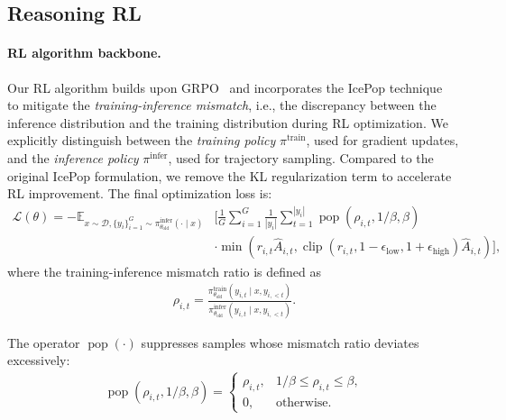 \subsection{Reasoning RL}

\paragraph{RL algorithm backbone.}
Our RL algorithm builds upon GRPO~\cite{shao2024deepseekmath} and incorporates the IcePop technique~\cite{IcePop2025} to mitigate the \emph{training-inference mismatch}, i.e., the discrepancy between the inference distribution and the training distribution during RL optimization. We explicitly distinguish between the \emph{training policy} $\pi^{\text{train}}$, used for gradient updates, and the \emph{inference policy} $\pi^{\text{infer}}$, used for trajectory sampling. Compared to the original IcePop formulation, we remove the KL regularization term to accelerate RL improvement.
The final optimization loss is:
\begin{equation}
\begin{aligned}
\mathcal{L}(\theta)=
-\mathbb{E}_{
x \sim \mathcal{D},
\{y_i\}_{i=1}^{G} \sim \pi^{\text{infer}}_{\theta_{\text{old}}}(\cdot \mid x)
}
&\Bigg[
\frac{1}{G}
\sum_{i=1}^{G}
\frac{1}{|y_i|}
\sum_{t=1}^{|y_i|}
\operatorname{pop}
(\rho_{i,t}, 1/\beta, \beta) \\
&\cdot
\min\!\left(
r_{i,t}\hat{A}_{i,t},
\operatorname{clip}\!\left(
r_{i,t},
1-\epsilon_{\text{low}},
1+\epsilon_{\text{high}}
\right)
\hat{A}_{i,t}
\right)
\Bigg],
\label{icepop}
\end{aligned}
\end{equation}
where the training-inference mismatch ratio is defined as
\begin{align*}
\rho_{i,t}
=
\frac{
\pi_{\theta_{\text{old}}}^{\text{train}}(y_{i,t} \mid x, y_{i,<t})
}{
\pi_{\theta_{\text{old}}}^{\text{infer}}(y_{i,t} \mid x, y_{i,<t})
}.
\end{align*}

The operator $\operatorname{pop}(\cdot)$ suppresses samples whose mismatch ratio deviates excessively:
\begin{align*}
\operatorname{pop}(\rho_{i,t}, 1/\beta, \beta)
=
\begin{cases}
\rho_{i,t}, & 1/\beta \le \rho_{i,t} \le \beta, \\
0, & \text{otherwise}.
\end{cases}
\end{align*}

